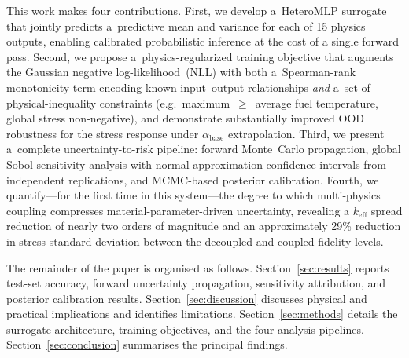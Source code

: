 \documentclass[pdflatex,sn-mathphys-num]{sn-jnl}
\theoremstyle{thmstyleone}
\theoremstyle{thmstyletwo}
\theoremstyle{thmstylethree}
\begin{document}

This work makes four contributions.
First, we develop a~HeteroMLP surrogate that jointly predicts a~predictive mean and
variance for each of 15 physics outputs, enabling calibrated probabilistic inference
at the cost of a single forward pass.
Second, we propose a~physics-regularized training objective that augments the
Gaussian negative log-likelihood~(NLL) with both a~Spearman-rank monotonicity term
encoding known input--output relationships \emph{and} a~set of physical-inequality
constraints (e.g.\ maximum~$\geq$~average fuel temperature, global stress
non-negative), and demonstrate substantially improved OOD robustness for the stress
response under $\alpha_{\mathrm{base}}$ extrapolation.
Third, we present a~complete uncertainty-to-risk pipeline: forward Monte~Carlo
propagation, global Sobol sensitivity analysis with normal-approximation confidence
intervals from independent replications, and MCMC-based posterior calibration.
Fourth, we quantify---for the first time in this system---the degree to which
multi-physics coupling compresses material-parameter-driven uncertainty, revealing a
$k_{\mathrm{eff}}$ spread reduction of nearly two orders of magnitude and an
approximately 29\% reduction in stress standard deviation between the decoupled
and coupled fidelity levels.

The remainder of the paper is organised as follows.
Section~\ref{sec:results} reports test-set accuracy, forward uncertainty propagation,
sensitivity attribution, and posterior calibration results.
Section~\ref{sec:discussion} discusses physical and practical implications and
identifies limitations.
Section~\ref{sec:methods} details the surrogate architecture, training objectives,
and the four analysis pipelines.
Section~\ref{sec:conclusion} summarises the principal findings.
\end{document}

